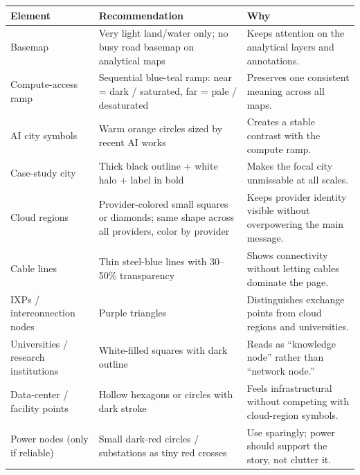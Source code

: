 \documentclass[11pt]{article}
\begin{document}
\begin{center}
\begin{tabularx}{\textwidth}{P{0.24\textwidth} P{0.33\textwidth} Y}
\toprule
\textbf{Element} & \textbf{Recommendation} & \textbf{Why} \\
\midrule
Basemap & Very light land/water only; no busy road basemap on analytical maps & Keeps attention on the analytical layers and annotations. \\
Compute-access ramp & Sequential blue-teal ramp: near = dark / saturated, far = pale / desaturated & Preserves one consistent meaning across all maps. \\
AI city symbols & Warm orange circles sized by recent AI works & Creates a stable contrast with the compute ramp. \\
Case-study city & Thick black outline + white halo + label in bold & Makes the focal city unmissable at all scales. \\
Cloud regions & Provider-colored small squares or diamonds; same shape across all providers, color by provider & Keeps provider identity visible without overpowering the main message. \\
Cable lines & Thin steel-blue lines with 30--50\% transparency & Shows connectivity without letting cables dominate the page. \\
IXPs / interconnection nodes & Purple triangles & Distinguishes exchange points from cloud regions and universities. \\
Universities / research institutions & White-filled squares with dark outline & Reads as ``knowledge node'' rather than ``network node.'' \\
Data-center / facility points & Hollow hexagons or circles with dark stroke & Feels infrastructural without competing with cloud-region symbols. \\
Power nodes (only if reliable) & Small dark-red circles / substations as tiny red crosses & Use sparingly; power should support the story, not clutter it. \\
\bottomrule
\end{tabularx}
\end{center}
\end{document}
